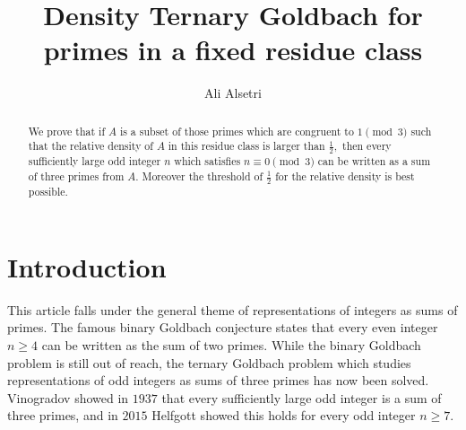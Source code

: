\documentclass[a4paper,11pt,twoside]{amsart}
\theoremstyle{definition}
\numberwithin{equation}{section}
\begin{document}
\title{Density Ternary Goldbach for primes in a fixed residue class}

\author[Alsetri]{Ali Alsetri}
\address{Department of Mathematics, University of Kentucky\\
715 Patterson Office Tower\\
Lexington, KY 40506\\
USA}






\begin{abstract}
We prove that if $A$ is a subset of those primes which are congruent to $1 \pmod{3}$ such that the relative density of $A$ in this residue class is larger than $\frac{1}{2},$ then every sufficiently large odd integer $n$ which satisfies $n \equiv 0 \pmod{3}$ can be written as a sum of three primes from $A.$ Moreover the threshold of $\frac{1}{2}$ for the relative density is best possible.


\end{abstract}
\maketitle


\section{Introduction}
This article falls under the general theme of representations of integers as sums of primes. The famous binary Goldbach conjecture states that every even integer $n \geq 4$ can be written as the sum of two primes. While the binary Goldbach problem is still out of reach, the ternary Goldbach problem which studies representations of odd integers as sums of three primes has now been solved. Vinogradov \cite{Vinogradov} showed in $1937$ that every sufficiently large odd integer is a sum of three primes, and in $2015$ Helfgott \cite{Helfgott} showed this holds for every odd integer $n \geq 7.$
\end{document}
